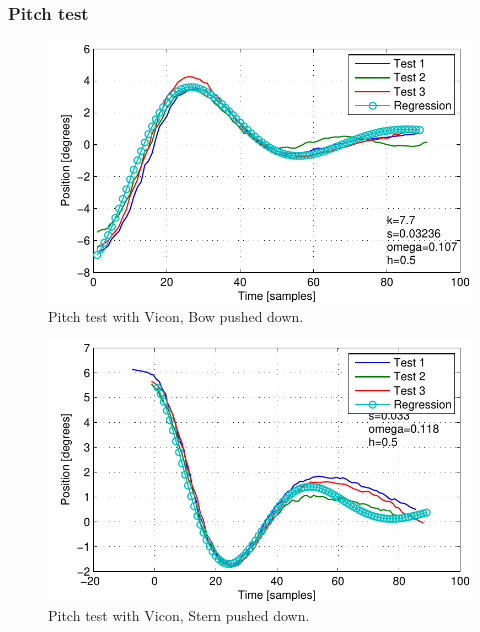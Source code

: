 \subsubsection{Pitch test}
\begin{figure}[H]
	\centering
	\includegraphics{plot/pbtest}
	\caption{Pitch test with Vicon, Bow pushed down.}
	\label{fig:pbtest}
\end{figure}
\begin{figure}[H]
	\centering
	\includegraphics{plot/pstest}
	\caption{Pitch test with Vicon, Stern pushed down.}
	\label{fig:pstest}
\end{figure}

\newpage
